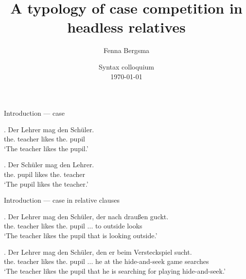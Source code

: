 \documentclass[xcolor=dvipsnames,10pt]{beamer}
\title{A typology of case competition in headless relatives}
\author{Fenna Bergsma}
\date{Syntax colloquium\\ \today}
\institute{Goethe-Universität Frankfurt}
\begin{document}
\begin{frame}
\titlepage

\end{frame}

\begin{frame}{Introduction --- case}

\exg. Der Lehrer mag den Schüler.\\
 the.\textcolor{Turquoise}{} teacher likes the.\textcolor{LimeGreen}{} pupil\\
 `The teacher likes the pupil.'\label{ex:german-case-1}

\pause

\exg. Der Schüler mag den Lehrer.\\
 the.\textcolor{Turquoise}{} pupil likes the.\textcolor{LimeGreen}{} teacher\\
 `The pupil likes the teacher.'\label{ex:german-case-2}

\end{frame}


\begin{frame}{Introduction --- case in relative clauses}

\exg. Der Lehrer mag den Schüler, der nach draußen guckt.\\
the. teacher likes the.\textcolor{LimeGreen}{} pupil ...\textcolor{Turquoise}{} to outside looks\\
`The teacher likes the pupil that is looking outside.'\label{ex:german-relative-1}

\pause

\exg. Der Lehrer mag den Schüler, den er beim Versteckspiel sucht.\\
the. teacher likes the.\textcolor{LimeGreen}{} pupil ...\textcolor{LimeGreen}{} he {at the} {hide-and-seek game} searches\\
`The teacher likes the pupil that he is searching for playing hide-and-seek.'\label{ex:german-relative-2}

\end{frame}
\end{document}
